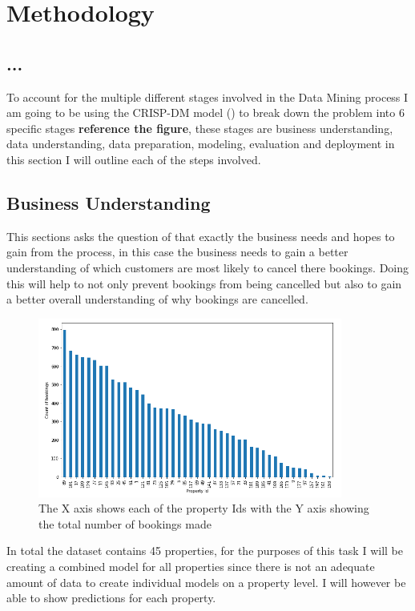 \chapter{Methodology}
\label{ch:method}
\section{...}
To account for the multiple different stages involved in the Data Mining process I am going to be using the CRISP-DM model (\cite{WirthCRISP-DM:Mining}) to break down the problem into 6 specific stages \textbf{reference the figure}, these stages are business understanding, data understanding, data preparation, modeling, evaluation and deployment in this section I will outline each of the steps involved.


\section{Business Understanding}

This sections asks the question of that exactly the business needs and hopes to gain from the process, in this case the business needs to gain a better understanding of which customers are most likely to cancel there bookings. Doing this will help to not only prevent bookings from being cancelled but also to gain a better overall understanding of why bookings are cancelled. 

\begin{figure}[hbt!]
 \includegraphics[width=10cm]{figures/bookings_by_property.png}
 \caption{The X axis shows each of the property Ids with the Y axis showing the total number of bookings made}
\end{figure}

In total the dataset contains 45 properties, for the purposes of this task I will be creating a combined model for all properties since there is not an adequate amount of data to create individual models on a property level. I will however be able to show predictions for each property. 

